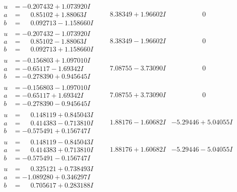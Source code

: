 \documentclass[1p]{elsarticle_modified}
\theoremstyle{definition}
\begin{document}
$$\begin{array}{c|c|c}
\begin{aligned}
u &= -0.207432 + 1.073920 I \\
a &= \phantom{-}0.85102 + 1.88063 I \\
b &= \phantom{-}0.092713 - 1.158660 I\end{aligned}
 & \phantom{-}8.38349 + 1.96602 I & \phantom{-0.000000 } 0 \\ \hline\begin{aligned}
u &= -0.207432 - 1.073920 I \\
a &= \phantom{-}0.85102 - 1.88063 I \\
b &= \phantom{-}0.092713 + 1.158660 I\end{aligned}
 & \phantom{-}8.38349 - 1.96602 I & \phantom{-0.000000 } 0 \\ \hline\begin{aligned}
u &= -0.156803 + 1.097010 I \\
a &= -0.65117 - 1.69342 I \\
b &= -0.278390 + 0.945645 I\end{aligned}
 & \phantom{-}7.08755 - 3.73090 I & \phantom{-0.000000 } 0 \\ \hline\begin{aligned}
u &= -0.156803 - 1.097010 I \\
a &= -0.65117 + 1.69342 I \\
b &= -0.278390 - 0.945645 I\end{aligned}
 & \phantom{-}7.08755 + 3.73090 I & \phantom{-0.000000 } 0 \\ \hline\begin{aligned}
u &= \phantom{-}0.148119 + 0.845043 I \\
a &= \phantom{-}0.414383 - 0.713810 I \\
b &= -0.575491 + 0.156747 I\end{aligned}
 & \phantom{-}1.88176 - 1.60682 I & -5.29446 + 5.04055 I \\ \hline\begin{aligned}
u &= \phantom{-}0.148119 - 0.845043 I \\
a &= \phantom{-}0.414383 + 0.713810 I \\
b &= -0.575491 - 0.156747 I\end{aligned}
 & \phantom{-}1.88176 + 1.60682 I & -5.29446 - 5.04055 I \\ \hline\begin{aligned}
u &= \phantom{-}0.325121 + 0.738493 I \\
a &= -1.089280 + 0.346297 I \\
b &= \phantom{-}0.705617 + 0.283188 I\end{aligned}

\end{array}$$
\end{document}
